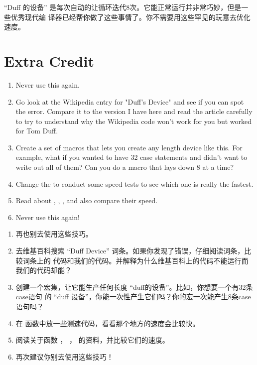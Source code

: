 “Duff 的设备” 是每次自动的让循环迭代8次。它能正常运行并非常巧妙，但是一些优秀现代编
译器已经帮你做了这些事情了。你不需要用这些罕见的玩意去优化速度。


\section{Extra Credit}

\begin{enumerate}
\item Never use this again.

\item Go look at the Wikipedia entry for "Duff's Device" and see if you can
    spot the error.  Compare it to the version I have here and read the article
    carefully to try to understand why the Wikipedia code won't work for you
    but worked for Tom Duff.

\item Create a set of macros that lets you create any length device like this.
    For example, what if you wanted to have 32 case statements and didn't want
    to write out all of them? Can you do a macro that lays down 8 at a time?

\item Change the  to conduct some speed tests to see which one is
    really the fastest.

\item Read about , , , and also compare
    their speed.

\item Never use this again!
\end{enumerate}

\begin{enumerate}
\section{加分练习}
\item 再也别去使用这些技巧。

\item 去维基百科搜索 “Duff Device” 词条。如果你发现了错误，仔细阅读词条，比较词条上的
	代码和我们的代码。并解释为什么维基百科上的代码不能运行而我们的代码却能？

\item 创建一个宏集，让它能生产任何长度 “duff的设备”。比如，你想要一个有32条case语句
	的 “duff 设备”，你能一次性产生它们吗？你的宏一次能产生8条case语句吗？

\item 在  函数中放一些测速代码，看看那个地方的速度会比较快。

\item 阅读关于函数 ， ，  的资料，并比较它们的速度。

\item 再次建议你别去使用这些技巧！
\end{enumerate}
